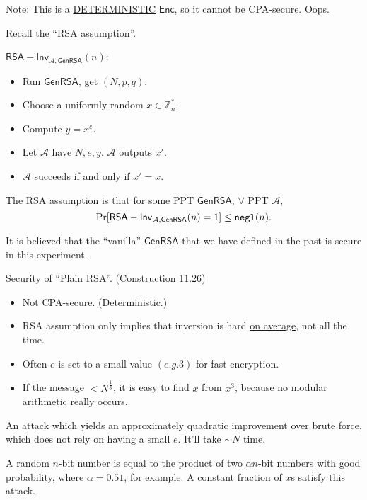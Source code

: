 \documentclass[12pt]{article}
\newcommand{\Z}{\mathbb{Z}}
\newcommand{\AAA}{\mathcal{A}}
\newcommand{\Enc}{\mathsf{Enc}}
\newcommand{\GenRSA}{\mathsf{GenRSA}}
\newcommand{\ExptRSAArgs}[2]{\mathsf{RSA-Inv}_{#1,#2}}
\newcommand{\ExptRSA}{\ExptRSAArgs{\AAA}{\GenRSA}}
\newcommand{\negl}{{\tt negl}}
\begin{document}
Note: This is a \underline{DETERMINISTIC} $\Enc$, so it cannot be CPA-secure. Oops.

Recall the ``RSA assumption''.

$\ExptRSA(n)$:\begin{itemize}

\item Run $\GenRSA$, get $(N,p,q)$.

\item Choose a uniformly random $x\in\Z_n^*$.

\item Compute $y=x^e$.

\item Let $\AAA$ have $N,e,y$. $\AAA$ outputs $x'$.

\item $\AAA$ succeeds if and only if $x'=x$.

\end{itemize}

The RSA assumption is that for some PPT $\GenRSA$, $\forall$ PPT $\AAA$, $$\Pr[\ExptRSA(n)=1]\leq\negl(n).$$

It is believed that the ``vanilla'' $\GenRSA$ that we have defined in the past is secure in this experiment.

Security of ``Plain RSA''. (Construction 11.26)\begin{itemize}

\item Not CPA-secure. (Deterministic.)

\item RSA assumption only implies that inversion is hard \underline{on average}, not all the time.

\item Often $e$ is set to a small value $(e.g. 3)$ for fast encryption.

\item If the message $<N^{\frac{1}{3}}$, it is easy to find $x$ from $x^3$, because no modular arithmetic really occurs.

\end{itemize}

An attack which yields an approximately quadratic improvement over brute force, which does not rely on having a small $e$. It'll take $\sim N$ time.

A random $n$-bit number is equal to the product of two $\alpha n$-bit numbers with good probability, where $\alpha=0.51$, for example. A constant fraction of $x$s satisfy this attack.
\end{document}
